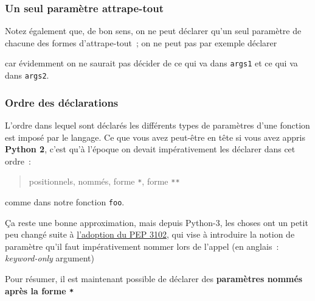     \hypertarget{un-seul-paramuxe8tre-attrape-tout}{%
\subsubsection{Un seul paramètre
attrape-tout}\label{un-seul-paramuxe8tre-attrape-tout}}

    Notez également que, de bon sens, on ne peut déclarer qu'un seul
paramètre de chacune des formes d'attrape-tout~; on ne peut pas par
exemple déclarer

\begin{Shaded}
\begin{Highlighting}[frame=lines,framerule=0.6mm,rulecolor=\color{asisframecolor}]
\OperatorTok{*}\OperatorTok{*}
\end{Highlighting}
\end{Shaded}

car évidemment on ne saurait pas décider de ce qui va dans
\texttt{args1} et ce qui va dans \texttt{args2}.

    \hypertarget{ordre-des-duxe9clarations}{%
\subsubsection{Ordre des déclarations}\label{ordre-des-duxe9clarations}}

    L'ordre dans lequel sont déclarés les différents types de paramètres
d'une fonction est imposé par le langage. Ce que vous avez peut-être en
tête si vous avez appris \textbf{Python 2}, c'est qu'à l'époque on
devait impérativement les déclarer dans cet ordre~:

\begin{quote}
positionnels, nommés, forme \texttt{*}, forme \texttt{**}
\end{quote}

comme dans notre fonction \texttt{foo}.

    Ça reste une bonne approximation, mais depuis Python-3, les choses ont
un petit peu changé suite à
\href{https://www.python.org/dev/peps/pep-3102/}{l'adoption du PEP
3102}, qui vise à introduire la notion de paramètre qu'il faut
impérativement nommer lors de l'appel (en anglais~: \emph{keyword-only}
argument)

    Pour résumer, il est maintenant possible de déclarer des
\textbf{paramètres nommés après la forme \texttt{*}}

